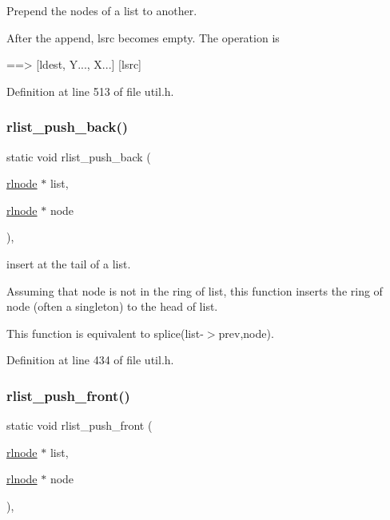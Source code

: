 Prepend the nodes of a list to another. 

After the append, {\ttfamily lsrc} becomes empty. The operation is \begin{DoxyVerb}[ldest, X...] [lsrc, Y...]  ==> [ldest, Y..., X...]  [lsrc]
\end{DoxyVerb}
 

Definition at line 513 of file util.\+h.

\mbox{\label{group__rlists_gac454004e8fb74ccd539e7fbd1affa86a}} 
\subsubsection{\texorpdfstring{rlist\+\_\+push\+\_\+back()}{rlist\_push\_back()}}
{\footnotesize\ttfamily static void rlist\+\_\+push\+\_\+back (\begin{DoxyParamCaption}\item[{\hyperlink{group__rlists_ga8f6244877f7ce2322c90525217ea6e7a}{rlnode} $\ast$}]{list,  }\item[{\hyperlink{group__rlists_ga8f6244877f7ce2322c90525217ea6e7a}{rlnode} $\ast$}]{node }\end{DoxyParamCaption})\hspace{0.3cm}{\ttfamily [inline]}, {\ttfamily [static]}}



insert at the tail of a list. 

Assuming that {\ttfamily node} is not in the ring of {\ttfamily list}, this function inserts the ring of {\ttfamily node} (often a singleton) to the head of {\ttfamily list}.

This function is equivalent to {\ttfamily splice}(list-\/$>$prev,node). 

Definition at line 434 of file util.\+h.

\mbox{\label{group__rlists_ga63ab59e50f2007a6bfedb0180a73b06f}} 
\subsubsection{\texorpdfstring{rlist\+\_\+push\+\_\+front()}{rlist\_push\_front()}}
{\footnotesize\ttfamily static void rlist\+\_\+push\+\_\+front (\begin{DoxyParamCaption}\item[{\hyperlink{group__rlists_ga8f6244877f7ce2322c90525217ea6e7a}{rlnode} $\ast$}]{list,  }\item[{\hyperlink{group__rlists_ga8f6244877f7ce2322c90525217ea6e7a}{rlnode} $\ast$}]{node }\end{DoxyParamCaption})\hspace{0.3cm}{\ttfamily [inline]}, {\ttfamily [static]}}



